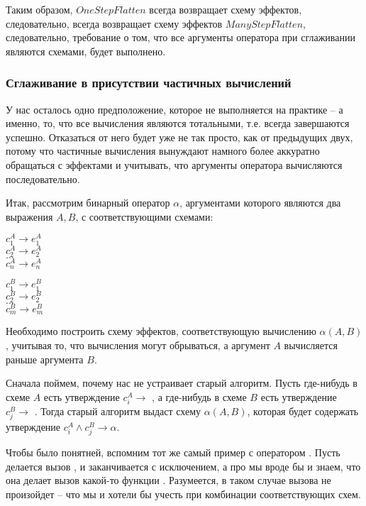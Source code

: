 Таким образом, $OneStepFlatten$ всегда возвращает схему эффектов, следовательно, всегда возвращает схему эффектов $ManyStepFlatten$, следовательно, требование о том, что все аргументы оператора при сглаживании являются схемами, будет выполнено.


\subsubsection{Сглаживание в присутствии частичных вычислений}

У нас осталось одно предположение, которое не выполняется на практике -- а именно, то, что все вычисления являются тотальными, т.е. всегда завершаются успешно. Отказаться от него будет уже не так просто, как от предыдущих двух, потому что частичные вычисления вынуждают намного более аккуратно обращаться с эффектами и учитывать, что аргументы оператора вычисляются последовательно. 

Итак, рассмотрим бинарный оператор $\alpha$, аргументами которого являются два выражения $A, B$, с соответствующими схемами:

{
	$c^A_1 \rightarrow e^A_1$ \\
	$c^A_2 \rightarrow e^A_2$ \\
	$\ldots$ \\
	$c^A_n \rightarrow e^A_n$ \\
}{}

\bigskip

{
	$c^B_1 \rightarrow e^B_1$ \\
	$c^B_2 \rightarrow e^B_2$ \\
	$\ldots$ \\
	$c^B_m \rightarrow e^B_m$ \\        
}{}

Необходимо построить схему эффектов, соответствующую вычислению $\alpha(A, B)$, учитывая то, что вычисления могут обрываться, а аргумент $A$ вычисляется раньше аргумента $B$.

Сначала поймем, почему нас не устраивает старый алгоритм. Пусть где-нибудь в схеме $A$ есть утверждение $c^A_i \rightarrow $ , а где-нибудь в схеме $B$ есть утверждение $c^B_j \rightarrow$ . Тогда старый алгоритм выдаст схему $\alpha(A, B)$, которая будет содержать утверждение $c^A_i \land c^B_j \rightarrow \alpha$. 

Чтобы было понятней, вспомним тот же самый пример с оператором \code{==}. Пусть делается вызов , и  заканчивается с исключением, а про  мы вроде бы и знаем, что она делает вызов какой-то функции . Разумеется, в таком случае вызова не произойдет -- что мы и хотели бы учесть при комбинации соответствующих схем.

